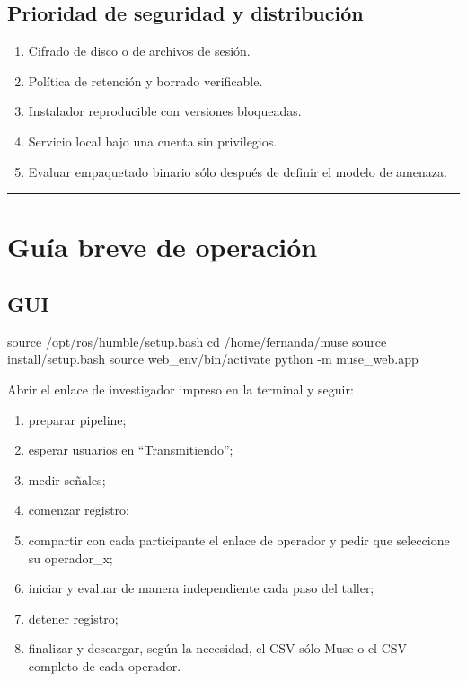 \documentclass[11pt,a4paper]{article}
\begin{document}
\subsection{Prioridad de seguridad y distribución}

\begin{enumerate}
\item Cifrado de disco o de archivos de sesión.
\item Política de retención y borrado verificable.
\item Instalador reproducible con versiones bloqueadas.
\item Servicio local bajo una cuenta sin privilegios.
\item Evaluar empaquetado binario sólo después de definir el modelo de amenaza.
\end{enumerate}

\medskip\hrule\medskip

\section{Guía breve de operación}

\subsection{GUI}

\begin{MuseCode}
source /opt/ros/humble/setup.bash
cd /home/fernanda/muse
source install/setup.bash
source web_env/bin/activate
python -m muse_web.app
\end{MuseCode}

Abrir el enlace de investigador impreso en la terminal y seguir:

\begin{enumerate}
\item preparar pipeline;
\item esperar usuarios en “Transmitiendo”;
\item medir señales;
\item comenzar registro;
\item compartir con cada participante el enlace de operador y pedir que seleccione su
{\ttfamily\small operador\_x};
\item iniciar y evaluar de manera independiente cada paso del taller;
\item detener registro;
\item finalizar y descargar, según la necesidad, el CSV sólo Muse o el CSV completo de
cada operador.
\end{enumerate}
\end{document}
